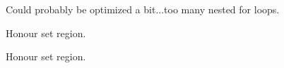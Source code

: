 \begin{DoxyRefList}
\item[\label{todo__todo000012}%
\hypertarget{todo__todo000012}{}%
Global \hyperlink{group__ilu__filter_ga609a51f490472174047feaf70918e3ac}{ilu\-Pixelize} (I\-Luint Pix\-Size)]Could probably be optimized a bit...too many nested for loops.


\item[\label{todo__todo000013}%
\hypertarget{todo__todo000013}{}%
Global \hyperlink{group__ilu__filter_gac3447a57b322058f1c2e49faa724e4f0}{ilu\-Replace\-Colour} (I\-Lubyte Red, I\-Lubyte Green, I\-Lubyte Blue, I\-Lfloat Tolerance)]Honour set region.  
\item[\label{todo__todo000014}%
\hypertarget{todo__todo000014}{}%
Global \hyperlink{group__ilu__filter_gab8e36ca96f5766b4c9fd6727d688405a}{ilu\-Sharpen} (I\-Lfloat Factor, I\-Luint Iter)]Honour set region. 
\end{DoxyRefList}